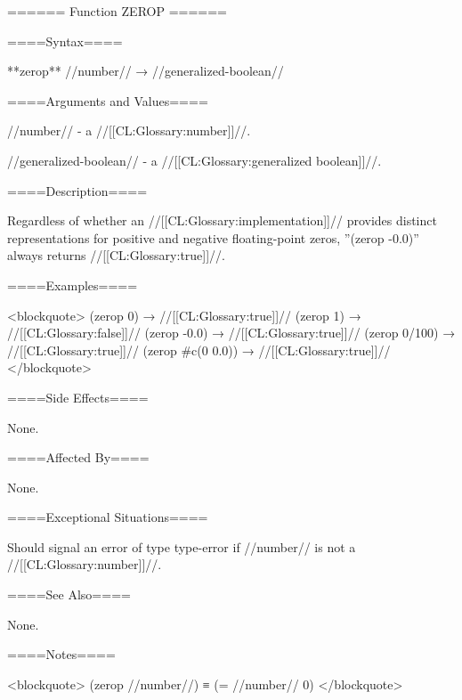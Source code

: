 ====== Function ZEROP ======

====Syntax====

**zerop** //number// → //generalized-boolean//

====Arguments and Values====

//number// - a //[[CL:Glossary:number]]//.

//generalized-boolean// - a //[[CL:Glossary:generalized boolean]]//.

====Description====


Regardless of whether an //[[CL:Glossary:implementation]]// provides distinct representations for positive and negative floating-point zeros, ''(zerop -0.0)'' always returns //[[CL:Glossary:true]]//.

====Examples====

<blockquote> (zerop 0) → //[[CL:Glossary:true]]// (zerop 1) → //[[CL:Glossary:false]]// (zerop -0.0) → //[[CL:Glossary:true]]// (zerop 0/100) → //[[CL:Glossary:true]]// (zerop #c(0 0.0)) → //[[CL:Glossary:true]]// </blockquote>

====Side Effects====

None.

====Affected By====

None.

====Exceptional Situations====

Should signal an error of type type-error if //number// is not a //[[CL:Glossary:number]]//.

====See Also====

None.

====Notes====

<blockquote> (zerop //number//) ≡ (= //number// 0) </blockquote>

